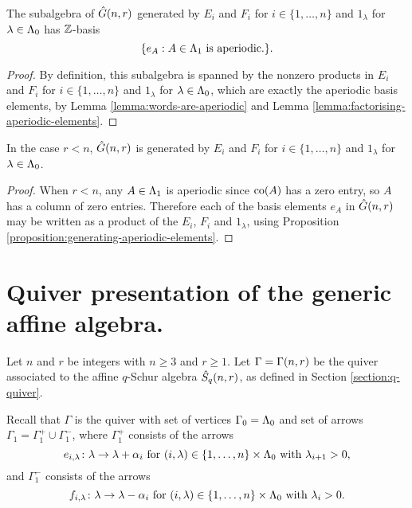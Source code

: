 \documentclass[a4paper, 11pt]{report}
\begin{document}
\begin{proposition}\label{proposition:generating-aperiodic-elements}
The subalgebra of $\hat{G}(n,r)$ generated by $E_i$ and $F_i$ for $i\in\{1,\ldots,n\}$ and $1_\lambda$ for $\lambda\in\Lambda_0{}$ has $\mathbb{Z}$-basis
\begin{equation*}
\{e_A:A\in\Lambda_1{}\text{ is aperiodic.}\}.
\end{equation*}
\end{proposition}

\begin{proof}
By definition, this subalgebra is spanned by the nonzero products in $E_i$ and $F_i$ for $i\in\{1,\ldots,n\}$ and $1_\lambda$ for $\lambda\in\Lambda_0{}$, which are exactly the aperiodic basis elements, by Lemma \ref{lemma:words-are-aperiodic} and Lemma \ref{lemma:factorising-aperiodic-elements}.
\end{proof}

\begin{lemma}
In the case $r<n$, $\hat{G}(n,r)$ is generated by $E_i$ and $F_i$ for $i\in\{1,\ldots,n\}$ and $1_\lambda$ for $\lambda\in\Lambda_0{}$.
\end{lemma}

\begin{proof}
When $r<n$, any $A\in\Lambda_1{}$ is aperiodic since $\operatorname{co}(A)$ has a zero entry, so $A$ has a column of zero entries. Therefore each of the basis elements $e_A$ in $\hat{G}(n,r)$ may be written as a product of the $E_i$, $F_i$ and $1_\lambda$, using Proposition \ref{proposition:generating-aperiodic-elements}.
\end{proof}


\section{Quiver presentation of the generic affine algebra.}

Let $n$ and $r$ be integers with $n\geq 3$ and $r\geq 1$. Let $\Gamma=\Gamma(n,r)$ be the quiver associated to the affine $q$-Schur algebra $\hat{S}_q(n,r)$, as defined in Section \ref{section:q-quiver}. 

Recall that $\Gamma$ is the quiver with set of vertices $\Gamma_0 = \Lambda_0{}$ and set of arrows $\Gamma_1=\Gamma_1^+\cup\Gamma_1^-$, where $\Gamma_1^+$ consists of the arrows
\begin{equation*}
e_{i,\lambda}\colon\lambda\to\lambda+\alpha_i \text{ for } (i,\lambda)\in\{1,\ldots,n\}\times\Lambda_0{} \text{ with } \lambda_{i+1}>0,
\end{equation*}
and $\Gamma_1^-$ consists of the arrows
\begin{equation*}
f_{i,\lambda}\colon\lambda\to\lambda-\alpha_i \text{ for } (i,\lambda)\in\{1,\ldots,n\}\times\Lambda_0{} \text{ with } \lambda_i>0.
\end{equation*}
\end{document}
